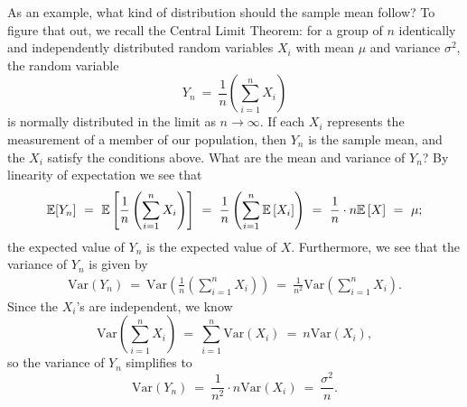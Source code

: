 As an example, what kind of distribution should the sample mean follow?  To figure that out, we recall the Central Limit Theorem: for a group of $n$ identically and independently distributed random variables $X_i$ with mean $\mu$ and variance $\sigma^2$, the random variable
\begin{equation*}
Y_n\ = \ \frac{1}{n}\left(\sum_{i=1}^{n} X_i\right)
\end{equation*}
is normally distributed in the limit as $n\rightarrow\infty$. If each $X_{i}$ represents the measurement of a member of our population, then $Y_n$ is the sample mean, and the $X_{i}$ satisfy the conditions above. What are the mean and variance of $Y_n$? By linearity of expectation we see that
\begin{equation*}
\E[Y_n]\ = \ \E\left[\frac{1}{n}\left(\sum_{i=1}^{n} X_i\right)\right]\ = \ \frac{1}{n}\left(\sum_{i=1}^{n}  \E\left[X_{i}\right]\right)\ =\ \frac{1}{n}\cdot n\E\left[X\right]\ = \ \mu;
\end{equation*}
the expected value of $Y_n$ is the expected value of $X$. Furthermore, we see that the variance of $Y_n$ is given by
\begin{eqnarray}
\textrm{Var}\left(Y_n\right)\ = \ \textrm{Var}\left(\frac{1}{n}\left(\sum_{i=1}^{n} X_{i}\right)\right) \ = \ \frac{1}{n^{2}}\textrm{Var}\left(\sum_{i=1}^{n} X_{i}\right).
\end{eqnarray}
Since the $X_{i}$'s are independent, we know
\begin{equation*}
\textrm{Var}\left(\sum_{i=1}^{n} X_{i}\right)\ = \ \sum_{i=1}^{n}\textrm{Var}(X_{i})\ = \ n\textrm{Var}(X_i),
\end{equation*}
so the variance of $Y_n$ simplifies to
\begin{equation*}
\textrm{Var}\left(Y_n\right)\ = \ \frac{1}{n^{2}}\cdot n\textrm{Var}(X_i)\ = \ \frac{\sigma^{2}}{n}.
\end{equation*}

